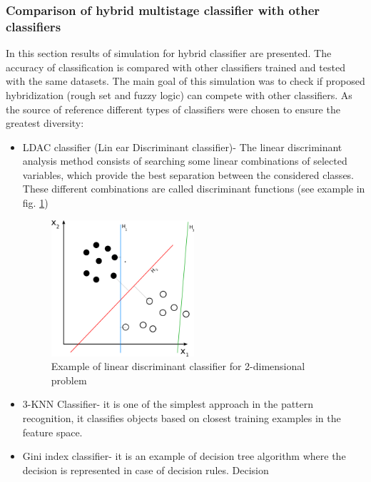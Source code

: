 \subsubsection{Comparison of hybrid multistage classifier with other classifiers}
\label{cha:Simulation_reaearch_5}
In this section results of simulation for hybrid classifier are presented. 
The accuracy of classification is compared with other classifiers trained and 
tested with the same datasets. The main goal of this simulation was to check if proposed
hybridization (rough set and fuzzy logic) can compete with other classifiers. 
As the source of reference different types of classifiers were chosen to ensure the greatest diversity:
\begin{itemize}
    \item LDAC classifier (Lin ear Discriminant classifier)- The linear
        discriminant analysis method consists of searching some linear
        combinations of selected variables, which provide the best separation between the
        considered classes. These different combinations are called
        discriminant functions (see example in fig. \ref{fig:ldac_example})
        \begin{figure}[H]
            \begin{center}
                \includegraphics[width=0.5\textwidth, height=0.4\textwidth]{fig/ldac.png}
            \end{center}
            \caption{Example of linear discriminant classifier for 2-dimensional problem}
            \label{fig:ldac_example}
        \end{figure}
    \item 3-KNN Classifier- it is one of the simplest approach in the pattern
        recognition, it classifies objects based on closest training examples
        in the feature space.
    \item Gini index classifier- it is an example of decision tree algorithm
        where the decision is represented in case of decision rules.  Decision

\end{itemize}
